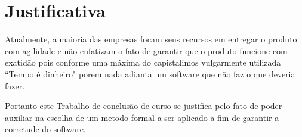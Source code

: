 \section{Justificativa}
Atualmente, a maioria das empresas focam seus recursos em entregar o produto com agilidade e não enfatizam o fato de garantir que o produto funcione com exatidão pois conforme uma máxima do capistalimos vulgarmente utilizada “Tempo é dinheiro" porem nada adianta um software que não faz o que deveria fazer.

Portanto este Trabalho de conclusão de curso se justifica pelo fato de poder auxiliar na escolha de um metodo formal a ser aplicado a fim de garantir a corretude do software.

